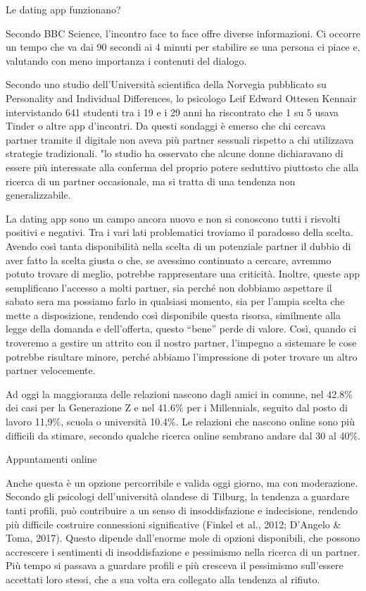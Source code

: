\documentclass[12pt]{book} %
\begin{document}
\begin{mdframed}[linewidth=1pt]
Le dating app funzionano?

Secondo BBC Science, l'incontro face to face offre
diverse informazioni. Ci occorre un tempo che va dai 90 secondi ai 4 minuti per stabilire se una persona ci piace e,
valutando con meno importanza i contenuti del dialogo.

Secondo uno studio dell'Università scientifica della Norvegia pubblicato su Personality and Individual Differences, lo
psicologo Leif Edward Ottesen Kennair intervistando 641 studenti tra i 19 e i 29 anni ha riscontrato che 1 su 5 usava
Tinder o altre app d'incontri. Da questi sondaggi è emerso che chi cercava partner tramite il digitale non aveva più
partner sessuali rispetto a chi utilizzava strategie tradizionali. "lo studio ha osservato che alcune donne dichiaravano di essere più interessate alla conferma del proprio potere seduttivo piuttosto che alla ricerca di un partner occasionale, ma si tratta di una tendenza non generalizzabile.

La dating app sono un campo ancora nuovo e non si conoscono tutti i risvolti positivi e negativi. Tra i vari lati
problematici troviamo il paradosso della scelta. Avendo così tanta disponibilità nella scelta di un potenziale partner
il dubbio di aver fatto la scelta giusta o che, se avessimo continuato a cercare, avremmo potuto trovare di meglio,
potrebbe rappresentare una criticità. Inoltre, queste app semplificano l'accesso a molti partner,
sia perché non dobbiamo aspettare il sabato sera ma possiamo farlo in qualsiasi momento, sia per
l'ampia scelta che mette a disposizione, rendendo così disponibile questa risorsa, similmente alla
legge della domanda e dell'offerta, questo “bene” perde di valore. Così, quando ci troveremo a
gestire un attrito con il nostro partner, l'impegno a sistemare le cose potrebbe risultare minore,
perché abbiamo l'impressione di poter trovare un altro partner velocemente.

Ad oggi la maggioranza delle relazioni nascono dagli amici in comune, nel 42.8\% dei casi per la Generazione Z e nel
41.6\% per i Millennials, seguito dal posto di lavoro 11,9\%, scuola o università 10.4\%. Le relazioni che nascono
online sono più difficili da stimare, secondo qualche ricerca online sembrano andare dal 30 al 40\%.

Appuntamenti online

Anche questa è un opzione percorribile e valida oggi giorno, ma con moderazione. Secondo gli psicologi dell'università
olandese di Tilburg, la  tendenza a guardare tanti profili, può contribuire a un senso di insoddisfazione e indecisione, rendendo più difficile costruire connessioni significative (Finkel et al., 2012; D’Angelo \& Toma, 2017). Questo dipende dall'enorme mole di opzioni disponibili, che possono accrescere i sentimenti di insoddisfazione e pessimismo nella ricerca di un partner. Più tempo si passava a guardare profili e più cresceva il
pessimismo sull'essere accettati loro stessi, che a sua volta era collegato alla tendenza al rifiuto.
\end{mdframed}
\end{document}
